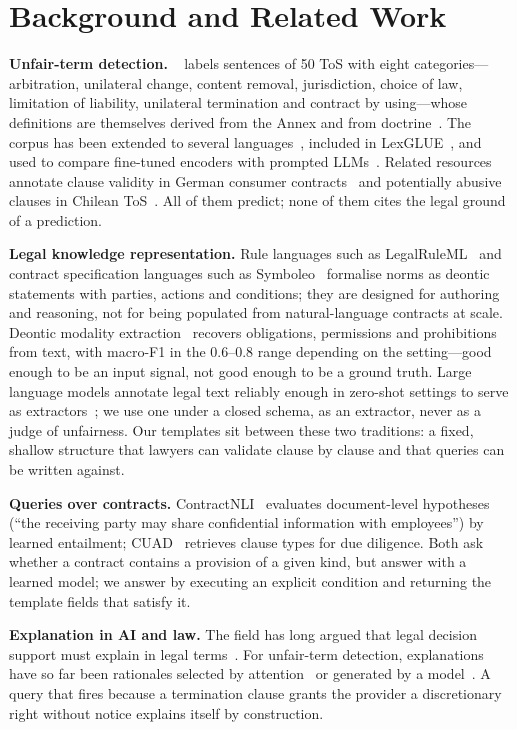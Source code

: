 \section{Background and Related Work}
\label{sec:related}
\textbf{Unfair-term detection.} \corpus{}~\cite{lippi2019claudette,lagioia2019deep} labels sentences of 50 ToS with eight categories---arbitration, unilateral change, content removal, jurisdiction, choice of law, limitation of liability, unilateral termination and contract by using---whose definitions are themselves derived from the Annex and from doctrine~\cite{micklitz2017empire}. The corpus has been extended to several languages~\cite{drawzeski2021corpus,galassi2024multilingual}, included in LexGLUE~\cite{chalkidis2022lexglue}, and used to compare fine-tuned encoders with prompted LLMs~\cite{panarelli2025worth}. Related resources annotate clause validity in German consumer contracts~\cite{braun2024agbde} and potentially abusive clauses in Chilean ToS~\cite{loffler2025chilean}. All of them predict; none of them cites the legal ground of a prediction.

\textbf{Legal knowledge representation.} Rule languages such as LegalRuleML~\cite{athan2015legalruleml} and contract specification languages such as Symboleo~\cite{sharifi2020symboleo} formalise norms as deontic statements with parties, actions and conditions; they are designed for authoring and reasoning, not for being populated from natural-language contracts at scale. Deontic modality extraction~\cite{chalkidis2018obligation,sancheti2022lexdemod} recovers obligations, permissions and prohibitions from text, with macro-F1 in the 0.6--0.8 range depending on the setting---good enough to be an input signal, not good enough to be a ground truth. Large language models annotate legal text reliably enough in zero-shot settings to serve as extractors~\cite{savelka2023unreasonable}; we use one under a closed schema, as an extractor, never as a judge of unfairness. Our templates sit between these two traditions: a fixed, shallow structure that lawyers can validate clause by clause and that queries can be written against.

\textbf{Queries over contracts.} ContractNLI~\cite{koreeda2021contractnli} evaluates document-level hypotheses (``the receiving party may share confidential information with employees'') by learned entailment; CUAD~\cite{hendrycks2021cuad} retrieves clause types for due diligence. Both ask whether a contract contains a provision of a given kind, but answer with a learned model; we answer by executing an explicit condition and returning the template fields that satisfy it.

\textbf{Explanation in AI and law.} The field has long argued that legal decision support must explain in legal terms~\cite{atkinson2020explanation}. For unfair-term detection, explanations have so far been rationales selected by attention~\cite{ruggeri2022memory} or generated by a model~\cite{liepina2020claudettetool}. A query that fires because a termination clause grants the provider a discretionary right without notice explains itself by construction.
